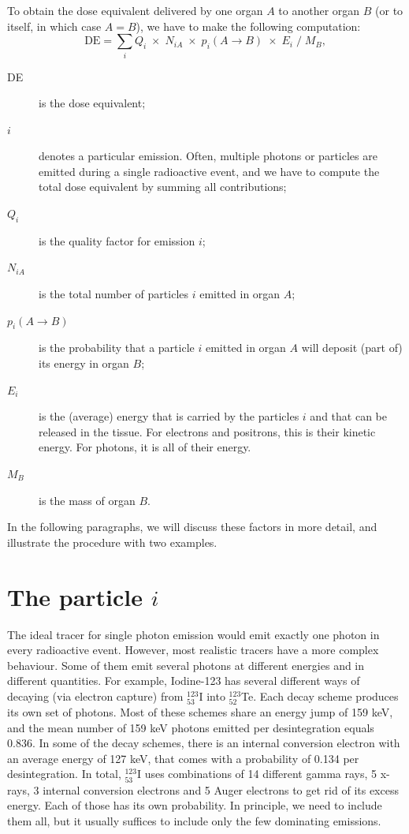 To obtain the dose equivalent delivered by one organ $A$ to another organ $B$
(or to itself, in which case $A = B$), we have to make the following
computation:
\begin{equation}
  \mbox{DE} = \sum_i Q_i \;\times\; N_{iA} \;\times\; p_i(A \rightarrow B) 
               \;\times\; E_i \;/\; M_B, \label{eq:DE}
\end{equation}
\begin{description}
  \item[DE] is the dose equivalent;

  \item[$i$] denotes a particular emission. Often, multiple photons or
            particles are emitted during a single radioactive event, and we
            have to compute the total dose equivalent by summing all
            contributions;

  \item[$Q_i$] is the quality factor for emission $i$;

  \item[$N_{iA}$] is the total number of particles $i$ emitted in organ $A$;

  \item[$p_i(A \rightarrow B)$] is the probability that a particle $i$ emitted
       in organ $A$ will deposit (part of) its energy in organ $B$;

  \item[$E_i$] is the (average) energy that is carried by the particles $i$ and
       that can be released in the tissue. For electrons and positrons, this is
       their kinetic energy. For photons, it is all of their energy.

  \item[$M_B$] is the mass of organ $B$.
\end{description}
In the following paragraphs, we will discuss these factors in more detail, and
illustrate the procedure with two examples.

\section{The particle $i$}
The ideal tracer for single photon emission would emit exactly one photon in
every radioactive event. However, most realistic tracers have a more complex
behaviour. Some of them emit several photons at different energies and in
different quantities. For example, Iodine-123 has several different ways of
decaying (via electron capture) from $^{123}_{53}$I into $^{123}_{52}$Te.
Each decay scheme produces its
own set of photons. Most of these schemes share an energy jump of 159 keV, and
the mean number of 159 keV photons emitted per desintegration equals
0.836. In some of the decay schemes, there is an internal conversion electron
with an average energy of 127 keV, that comes with a probability of 0.134 per
desintegration. In total,
$^{123}_{53}$I uses combinations of 14 different gamma rays, 5 x-rays, 3
internal conversion electrons and 5 Auger electrons to get rid of its excess
energy. Each of those has its own probability. In principle, we need to
include them all, but it usually suffices to include only the few dominating
emissions.

